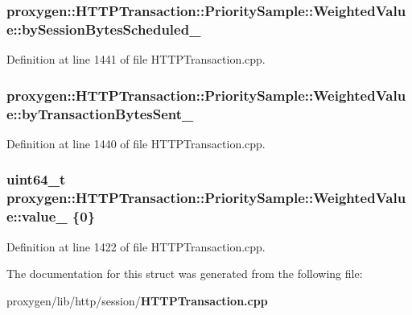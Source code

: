 \subsubsection[{by\+Session\+Bytes\+Scheduled\+\_\+}]{ proxygen\+::\+H\+T\+T\+P\+Transaction\+::\+Priority\+Sample\+::\+Weighted\+Value\+::by\+Session\+Bytes\+Scheduled\+\_\+\hspace{0.3cm}{\ttfamily [private]}}\label{structproxygen_1_1HTTPTransaction_1_1PrioritySample_1_1WeightedValue_a7b20abfa558fa297e83d11f6ad62dd17}


Definition at line 1441 of file H\+T\+T\+P\+Transaction.\+cpp.

\subsubsection[{by\+Transaction\+Bytes\+Sent\+\_\+}]{ proxygen\+::\+H\+T\+T\+P\+Transaction\+::\+Priority\+Sample\+::\+Weighted\+Value\+::by\+Transaction\+Bytes\+Sent\+\_\+\hspace{0.3cm}{\ttfamily [private]}}\label{structproxygen_1_1HTTPTransaction_1_1PrioritySample_1_1WeightedValue_a5a6956c3510f046d82492385be234951}


Definition at line 1440 of file H\+T\+T\+P\+Transaction.\+cpp.

\subsubsection[{value\+\_\+}]{\setlength{\rightskip}{0pt plus 5cm}uint64\+\_\+t proxygen\+::\+H\+T\+T\+P\+Transaction\+::\+Priority\+Sample\+::\+Weighted\+Value\+::value\+\_\+ \{0\}}\label{structproxygen_1_1HTTPTransaction_1_1PrioritySample_1_1WeightedValue_a13d49b7e43be3991db44472f554173a6}


Definition at line 1422 of file H\+T\+T\+P\+Transaction.\+cpp.



The documentation for this struct was generated from the following file\+:\begin{DoxyCompactItemize}
\item 
proxygen/lib/http/session/{\bf H\+T\+T\+P\+Transaction.\+cpp}\end{DoxyCompactItemize}
